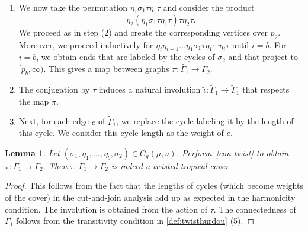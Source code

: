 \documentclass[10pt]{amsart}
\theoremstyle{plain}
\theoremstyle{definition}
\theoremstyle{definition}
\theoremstyle{plain}
\newtheorem{lemma}[lemma]{Lemma}
\theoremstyle{plain}
\theoremstyle{remark}
\theoremstyle{plain}
\theoremstyle{plain}
\begin{document}
\begin{construction}
\begin{enumerate}
\begin{enumerate}
\begin{figure}[H]
{}
        \end{figure}

    \end{enumerate}
    In each case, we further extend all ends not attached to a vertex over $p_1$ to~$[p_1,p_2]$.
    \item We now take the permutation $\eta_1\sigma_1\tau\eta_1\tau$ and consider the product
    \begin{equation*}
        \eta_2(\eta_1\sigma_1\tau\eta_1\tau)\tau\eta_2\tau.
    \end{equation*}
    We proceed as in step (2) and create the corresponding vertices over $p_2$. Moreover, we proceed inductively for $\eta_i\eta_{i-1}\dots\eta_1\sigma_1\tau\eta_1\cdots\eta_i\tau$ until $i=b$. For $i=b$, we obtain ends that are labeled by the cycles of $\sigma_2$ and that project to $[p_b,\infty)$. This gives a map between graphs $\tilde{\pi}\colon\tilde{\Gamma_1}\to\Gamma_2$.
    \item The conjugation by $\tau$ induces a natural involution $
    \tilde{\iota}\colon\tilde{\Gamma}_1\to\tilde{\Gamma}_1$ that respects the map $\tilde{\pi}$.
    \item Next, for each edge $e$ of $\tilde{\Gamma}_1$, we replace the cycle labeling it by the length of this cycle. We consider this cycle length as the weight of $e$. 
\end{enumerate}
\end{construction}

\begin{lemma}\label{lem-outcomeconstruction}
Let $(\sigma_1,
\eta_1,\dots,\eta_b,\sigma_2)\in C_g(\mu,\nu)$. Perform~\cref{con-twist} to obtain $\pi\colon\Gamma_1\to\Gamma_2$. Then $\pi\colon\Gamma_1\to\Gamma_2$ is indeed a twisted tropical cover.
    \end{lemma}

\begin{proof}
    This follows from the fact that the lengths of cycles (which become weights of the cover) in the cut-and-join analysis add up as expected in the harmonicity condition. The involution is obtained from the action of $\tau$. The connectedness of $\Gamma_1$ follows from the transitivity condition in \cref{def:twisthurdou} (5).
\end{proof}
\end{document}
